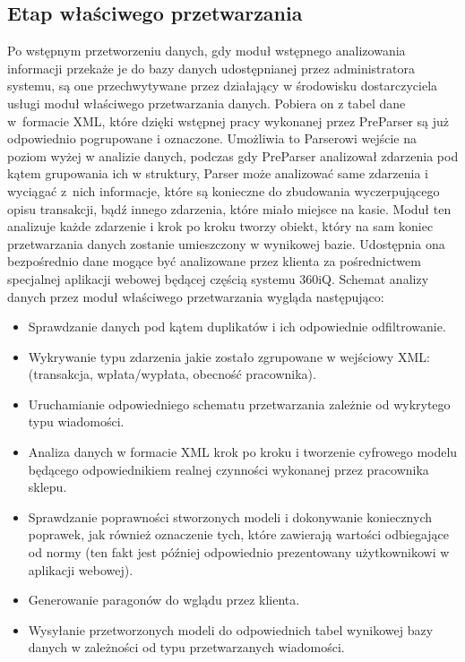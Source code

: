 \documentclass[a4paper]{book}
\begin{document}
\subsection{Etap właściwego przetwarzania}
Po wstępnym przetworzeniu danych, gdy moduł wstępnego analizowania informacji przekaże je do bazy danych udostępnianej przez administratora systemu, są one przechwytywane przez działający w środowisku dostarczyciela usługi moduł właściwego przetwarzania danych. Pobiera on z tabel dane w~formacie XML, które dzięki wstępnej pracy wykonanej przez PreParser są już odpowiednio pogrupowane i oznaczone. Umożliwia to Parserowi wejście na poziom wyżej w analizie danych, podczas gdy PreParser analizował zdarzenia pod kątem grupowania ich w struktury, Parser może analizować same zdarzenia i wyciągać z~nich informacje, które są konieczne do zbudowania wyczerpującego opisu transakcji, bądź innego zdarzenia, które miało miejsce na kasie.
Moduł ten analizuje każde zdarzenie i krok po kroku tworzy obiekt, który na sam koniec przetwarzania danych zostanie umieszczony w wynikowej bazie. Udostępnia ona bezpośrednio dane mogące być analizowane przez klienta za pośrednictwem specjalnej aplikacji webowej będącej częścią systemu 360iQ. Schemat analizy danych przez moduł właściwego przetwarzania wygląda następująco:
\begin{itemize}
\item Sprawdzanie danych pod kątem duplikatów i ich odpowiednie odfiltrowanie.
\item Wykrywanie typu zdarzenia jakie zostało zgrupowane w wejściowy XML: (transakcja, wpłata/wypłata, obecność pracownika).
\item Uruchamianie odpowiedniego schematu przetwarzania zależnie od wykrytego typu wiadomości.
\item Analiza danych w formacie XML krok po kroku i tworzenie cyfrowego modelu będącego odpowiednikiem realnej czynności wykonanej przez pracownika sklepu.
\item Sprawdzanie poprawności stworzonych modeli i dokonywanie koniecznych poprawek, jak również oznaczenie tych, które zawierają wartości odbiegające od normy (ten fakt jest później odpowiednio prezentowany użytkownikowi w aplikacji webowej).
\item Generowanie paragonów do wglądu przez klienta.
\item Wysyłanie przetworzonych modeli do odpowiednich tabel wynikowej bazy danych w zależności od typu przetwarzanych wiadomości.
\end{itemize}
\end{document}
